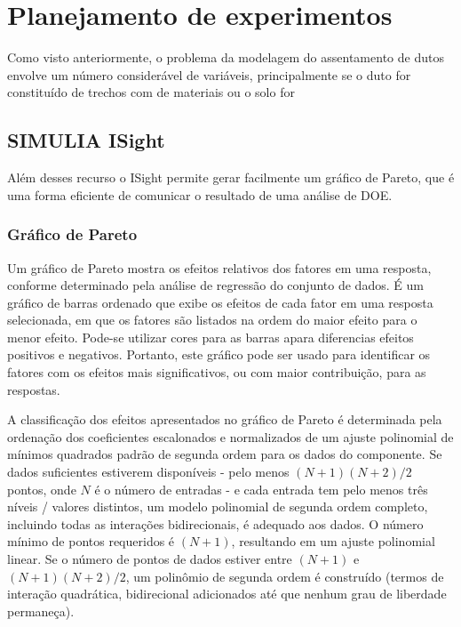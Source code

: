\chapter{Planejamento de experimentos}
\label{chap:doe}


Como visto anteriormente, o problema da modelagem do assentamento de dutos envolve um número considerável de variáveis, principalmente se o duto for constituído de trechos com de materiais ou o solo for 

\section{SIMULIA ISight}

Além desses recurso o ISight permite gerar facilmente um gráfico de Pareto, que é uma forma eficiente de comunicar o resultado de uma análise de DOE.

\subsection{Gráfico de Pareto}

Um gráfico de Pareto mostra os efeitos relativos dos fatores em uma resposta, conforme determinado pela análise de regressão do conjunto de dados. É um gráfico de barras ordenado que exibe os efeitos de cada fator em uma resposta selecionada, em que os fatores são listados na ordem do maior efeito para o menor efeito. Pode-se utilizar cores para as barras apara diferencias efeitos positivos e negativos. Portanto, este gráfico pode ser usado para identificar os fatores com os efeitos mais significativos, ou com maior contribuição, para as respostas.

A classificação dos efeitos apresentados no gráfico de Pareto é determinada pela ordenação dos coeficientes escalonados e normalizados de um ajuste polinomial de mínimos quadrados padrão de segunda ordem para os dados do componente. Se dados suficientes estiverem disponíveis - pelo menos $(N + 1) (N + 2) / 2$ pontos, onde $N$ é o número de entradas - e cada entrada tem pelo menos três níveis / valores distintos, um modelo polinomial de segunda ordem completo, incluindo todas as interações bidirecionais, é adequado aos dados. O número mínimo de pontos requeridos é $(N + 1)$, resultando em um ajuste polinomial linear. Se o número de pontos de dados estiver entre $(N + 1)$ e $(N + 1) (N + 2) / 2$, um polinômio de segunda ordem é construído (termos de interação quadrática, bidirecional adicionados até que nenhum grau de liberdade permaneça).

